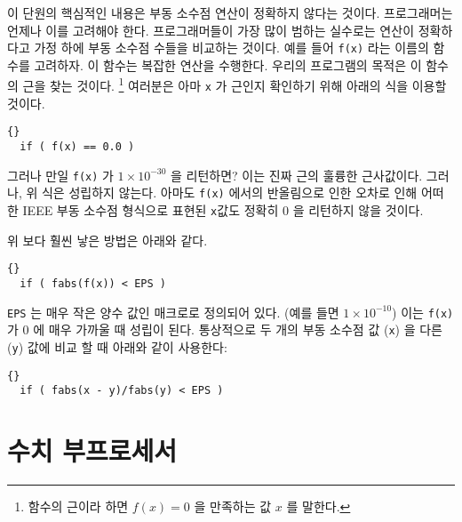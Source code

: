 이 단원의 핵심적인 내용은 부동 소수점 연산이 정확하지 않다는 것이다. 
프로그래머는 언제나 이를 고려해야 한다. 프로그래머들이 가장 많이
범하는 실수로는 연산이 정확하다고 가정 하에 부동 소수점 수들을 비교하는 것이다.
예를 들어 \lstinline|f(x)| 라는 이름의 함수를 고려하자. 이 함수는 복잡한 연산을 수행한다.
우리의 프로그램의 목적은 이 함수의 근을 찾는 것이다. 
\footnote{함수의 근이라 하면 $f(x) = 0$ 을 만족하는 값 $x$ 를 말한다.} 여러분은 아마
\lstinline|x| 가 근인지 확인하기 위해 아래의 식을 이용할 것이다. 

\begin{lstlisting}[stepnumber=0]{}
  if ( f(x) == 0.0 )
\end{lstlisting}
그러나 만일 \lstinline|f(x)| 가 $1 \times 10^{-30}$ 을 리턴하면? 이는
진짜 근의 훌륭한 근사값이다. 그러나, 위 식은 성립하지 않는다. 
아마도 \lstinline|f(x)| 에서의 반올림으로 인한 오차로 인해 어떠한 IEEE 부동 소수점 형식으로 표현된
\lstinline|x|값도 정확히 0 을 리턴하지 않을 것이다. 

위 보다 훨씬 낳은 방법은 아래와 같다. 

\begin{lstlisting}[stepnumber=0]{}
  if ( fabs(f(x)) < EPS )
\end{lstlisting}
\lstinline|EPS| 는 매우 작은 양수 값인 매크로로 정의되어 있다. (예를 들면 $1 \times 10^{-10}$)
이는 \lstinline|f(x)| 가 0 에 매우 가까울 때 성립이 된다. 통상적으로 두 개의 부동 소수점 값
(\lstinline|x|) 을 다른 (\lstinline|y|) 값에 비교 할 때 아래와 같이 사용한다: 

\begin{lstlisting}[stepnumber=0]{}
  if ( fabs(x - y)/fabs(y) < EPS )
\end{lstlisting}

\section{수치 부프로세서}
